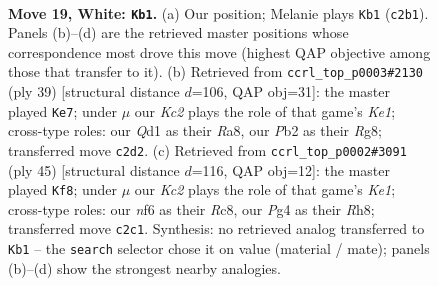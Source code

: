 \documentclass[11pt]{article}
\begin{document}
\clearpage

\begin{figure}[p]\centering
\begin{subfigure}{0.46\textwidth}\centering
\resizebox{\linewidth}{!}{%
\newchessgame
\chessboard[
  setfen={r1b1k2r/2p1qp2/2n2n2/3p2N1/3P2Pp/1p5P/1PK1PPB1/R2QB2R w kq - 0 19},
  showmover=false,
  pgfstyle=straightmove, color=movearrow, markmove={c2-b1}
]}
\caption{}
\end{subfigure}\hfill
\begin{subfigure}{0.46\textwidth}\centering
\resizebox{\linewidth}{!}{%
\newchessgame
\chessboard[
  setfen={r3k1r1/pbq2p2/3bp2p/1Bp1B3/Np1P3P/8/PP2QnP1/R3K2R b KQq - 1 20},
  showmover=false,
  pgfstyle=straightmove, color=movearrow, markmove={e8-e7}
]}
\caption{}
\end{subfigure}
\\[4pt]
\begin{subfigure}{0.46\textwidth}\centering
\resizebox{\linewidth}{!}{%
\newchessgame
\chessboard[
  setfen={2rqk2r/3n1p2/1p1bb3/1Q1p4/NP1P3p/4P3/3NBPP1/1R2K2R b Kk - 1 23},
  showmover=false,
  pgfstyle=straightmove, color=movearrow, markmove={e8-f8}
]}
\caption{}
\end{subfigure}\hfill

\caption{\textbf{Move 19, White: \texttt{Kb1}.} (a) Our position; Melanie plays \texttt{Kb1} (\texttt{c2b1}). Panels (b)--(d) are the retrieved master positions whose correspondence most drove this move (highest QAP objective among those that transfer to it). (b) Retrieved from \texttt{ccrl\_top\_p0003\#2130} (ply 39) [structural distance $d$=106, QAP obj=31]: the master played \texttt{Ke7}; under $\mu$ our \emph{Kc2} plays the role of that game's \emph{Ke1}; cross-type roles: our \emph{Q}d1 as their \emph{R}a8, our \emph{P}b2 as their \emph{R}g8; transferred move \texttt{c2d2}. (c) Retrieved from \texttt{ccrl\_top\_p0002\#3091} (ply 45) [structural distance $d$=116, QAP obj=12]: the master played \texttt{Kf8}; under $\mu$ our \emph{Kc2} plays the role of that game's \emph{Ke1}; cross-type roles: our \emph{n}f6 as their \emph{R}c8, our \emph{P}g4 as their \emph{R}h8; transferred move \texttt{c2c1}. Synthesis: no retrieved analog transferred to \texttt{Kb1} -- the \texttt{search} selector chose it on value (material / mate); panels (b)--(d) show the strongest nearby analogies.}
\label{fig:thought-m36}
\end{figure}

\clearpage
\end{document}
